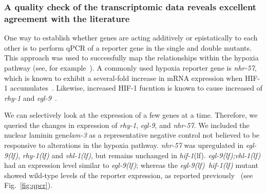 \documentclass[9pt,twocolumn,twoside]{pnas-new}
\newcommand{\gene}[1]{\emph{#1}}
\newcommand{\nhr}{\emph{\mbox{nhr-57}}}
\newcommand{\lam}{\emph{\mbox{lam-3}}}
\newcommand{\egl}{\emph{\mbox{egl-9}(lf)}}
\newcommand{\rhy}{\emph{\mbox{rhy-1}(lf)}}
\newcommand{\vhl}{\emph{\mbox{vhl-1}(lf)}}
\newcommand{\eglvhl}{\emph{\mbox{egl-9(lf);vhl-1(lf)}}}
\newcommand{\eglhif}{\emph{\mbox{egl-9(lf)}~\mbox{hif-1(lf)}}}
\newcommand{\hif}{\emph{\mbox{hif-1}}(lf)}
\newcommand{\hifp}{HIF-1}
\begin{document}
\subsubsection*{A quality check of the transcriptomic data reveals excellent agreement
            with the literature}
\label{sub:quality_check}
One way to establish whether genes are acting additively or epistatically to each
other is to perform qPCR of a reporter gene in the single and double mutants. This
approach was used to successfully map the relationships within the hypoxia
pathway (see, for example~\cite{Shao2009,Shen2006}). A commonly used hypoxia reporter
gene is \nhr{}, which is known to exhibit a several-fold increase in mRNA
expression when \hifp{} accumulates~\cite{Shen2006,Shen2005,Park2012}. Likewise,
increased \hifp{} fucntion is known to cause increased of \gene{rhy-1}
and \gene{egl-9}~\cite{Powell-Coffman2010}.

We can
selectively look at the expression of a few genes at a time. Therefore, we
queried the changes in expression of \gene{rhy-1}, \gene{egl-9}, and \nhr{}. We
included the nuclear laminin gene\lam{} as a representative negative control not
believed to be responsive to alterations in the hypoxia pathway.
\nhr{} was upregulated in \egl{}, \rhy{} and \vhl{}, but remains unchanged in \hif{}.
\eglvhl{} had an expression level similar to \egl{}; whereas the
\eglhif{} mutant showed wild-type levels of the reporter expression, as reported
previously~\cite{Shen2006} (see Fig.~\ref{fig:qpcr}).
\end{document}
